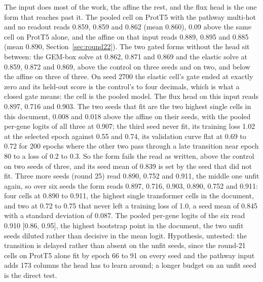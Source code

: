 


The input does most of the work, the affine the rest, and the flux head is the one
form that reaches past it. The pooled cell on ProtT5 with the pathway multi-hot and
no readout reads 0.859, 0.859 and 0.862 (mean 0.860), 0.09 above the same cell on
ProtT5 alone, and the affine on that input reads 0.889, 0.895 and 0.885 (mean 0.890,
Section~\ref{sec:round22}). The two gated forms without the head sit between: the
GEM-box solve at 0.862, 0.871 and 0.869 and the elastic solve at 0.859, 0.872 and
0.869, above the control on three seeds and on two, and below the affine on three of
three. On seed 2700 the elastic cell's gate ended at exactly zero and its held-out
score is the control's to four decimals, which is what a closed gate means: the cell
is the pooled model. The flux head on this input reads 0.897, 0.716 and 0.903. The
two seeds that fit are the two highest single cells in this document, 0.008 and
0.018 above the affine on their seeds, with the pooled per-gene logits of all three at
0.907; the third seed never fit, its training loss 1.02 at the selected epoch against
0.55 and 0.74, its validation curve flat at 0.69 to 0.72 for 200 epochs where the
other two pass through a late transition near epoch 80 to a loss of 0.2 to 0.3. So the
form fails the read as written, above the control on two seeds of three, and its seed
mean of 0.839 is set by the seed that did not fit. Three more seeds (round 25) read
0.890, 0.752 and 0.911, the middle one unfit again, so over six seeds the form reads
0.897, 0.716, 0.903, 0.890, 0.752 and 0.911: four cells at 0.890 to 0.911, the
highest single transformer cells in the document, and two at 0.72 to 0.75 that never
left a training loss of 1.0, a seed mean of 0.845 with a standard deviation of 0.087.
The pooled per-gene logits of the six read 0.910 [0.86, 0.95], the highest bootstrap
point in the document, the two unfit seeds diluted rather than decisive in the mean
logit. Hypothesis, untested: the transition is delayed rather than absent on the unfit
seeds, since the round-21 cells on ProtT5 alone fit by epoch 66 to 91 on every seed
and the pathway input adds 173 columns the head has to learn around; a longer budget
on an unfit seed is the direct test.

